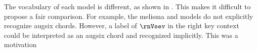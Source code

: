 
The vocabulary of each model is different, as shown in
. This makes it difficult to
propose a fair comparison. For example, the \gls{melisma}
and \textcite{mcleod2021modular} models do not explicitly
recognize \gls{augsix} chords. However, a label of $\rnVsev$
in the right key context could be interpreted as an
\gls{augsix} chord and recognized implicitly. This was a
motivation

